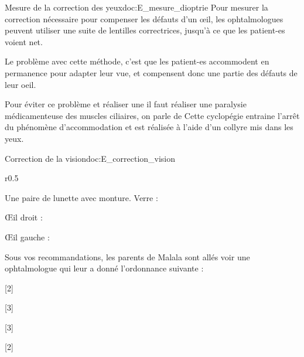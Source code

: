 \begin{doc}{Mesure de la correction des yeux}{doc:E_mesure_dioptrie}
  Pour mesurer la correction nécessaire pour compenser les défauts d'un œil, les ophtalmologues peuvent utiliser une suite de lentilles correctrices, jusqu'à ce que les patient-es voient net.

  Le problème avec cette méthode, c'est que les patient-es accommodent en permanence pour adapter leur vue, et compensent donc une partie des défauts de leur oeil. 

  Pour éviter ce problème et réaliser une  il faut réaliser une paralysie médicamenteuse des muscles ciliaires, on parle de 
  Cette cyclopégie entraine l'arrêt du phénomène d'accommodation et est réalisée à l'aide d'un collyre mis dans les yeux.
\end{doc}


\begin{doc}{Correction de la vision}{doc:E_correction_vision}
  \begin{wrapfigure}{r}{0.5\linewidth}
    \vspace*{-34pt}
    \begin{boite}
      Une paire de lunette avec monture. Verre :
      
      \centering
      Œil droit : \hfill {}
      
      Œil gauche : \hfill {}
    \end{boite}
  \end{wrapfigure}
  Sous vos recommandations, les parents de Malala sont allés voir une ophtalmologue qui leur a donné l'ordonnance suivante :  
\end{doc}

[2]

[3]

[3]

[2]